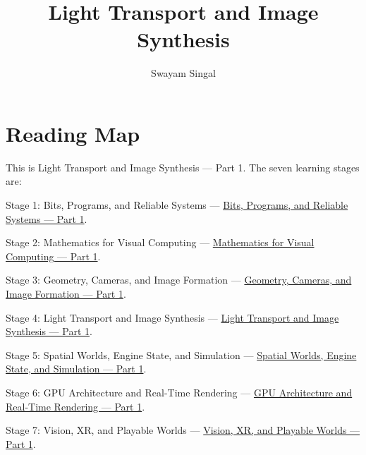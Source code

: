 \documentclass[11pt,twoside,openany]{book}
\title{Light Transport and Image Synthesis}
\author{Swayam Singal}
\begin{document}
\maketitle
\begin{center}\end{center}
\chapter*{Reading Map}
\hypertarget{volume-reading-map}{}
\noindent This is Light Transport and Image Synthesis --- Part 1. The seven learning stages are:
\par\noindent Stage 1: Bits, Programs, and Reliable Systems --- \href{../01-Bits-Programs-and-Reliable-Systems-P01/main.pdf}{Bits, Programs, and Reliable Systems — Part 1}.
\par\noindent Stage 2: Mathematics for Visual Computing --- \href{../02-Mathematics-for-Visual-Computing-P01/main.pdf}{Mathematics for Visual Computing — Part 1}.
\par\noindent Stage 3: Geometry, Cameras, and Image Formation --- \href{../03-Geometry-Cameras-and-Image-Formation-P01/main.pdf}{Geometry, Cameras, and Image Formation — Part 1}.
\par\noindent Stage 4: Light Transport and Image Synthesis --- \href{../04-Light-Transport-and-Image-Synthesis-P01/main.pdf}{Light Transport and Image Synthesis — Part 1}.
\par\noindent Stage 5: Spatial Worlds, Engine State, and Simulation --- \href{../05-Spatial-Worlds-Engine-State-and-Simulation-P01/main.pdf}{Spatial Worlds, Engine State, and Simulation — Part 1}.
\par\noindent Stage 6: GPU Architecture and Real-Time Rendering --- \href{../06-GPU-Architecture-and-Real-Time-Rendering-P01/main.pdf}{GPU Architecture and Real-Time Rendering — Part 1}.
\par\noindent Stage 7: Vision, XR, and Playable Worlds --- \href{../07-Vision-XR-and-Playable-Worlds-P01/main.pdf}{Vision, XR, and Playable Worlds — Part 1}.
\tableofcontents
\mainmatter
\setcounter{chapter}{0}




\end{document}
